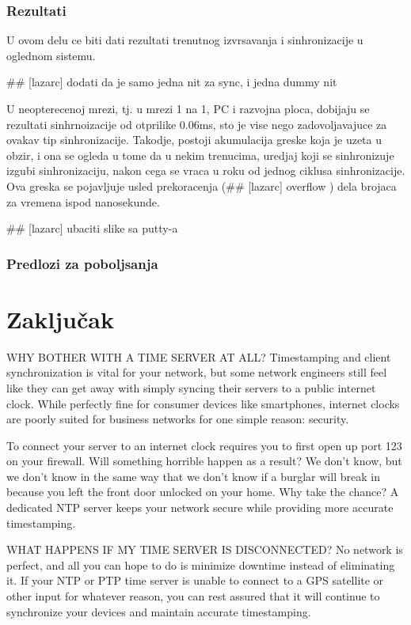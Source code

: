 \documentclass[a4paper,12pt, master]{etf}
\begin{document}
    \subsection{Rezultati}

    U ovom delu ce biti dati rezultati trenutnog izvrsavanja i sinhronizacije u oglednom sistemu.

    \#\# [lazarc] dodati da je samo jedna nit za sync, i jedna dummy nit

    U neopterecenoj mrezi, tj. u mrezi 1 na 1, PC i razvojna ploca, dobijaju se rezultati sinhrnoizacije od 
    otprilike 0.06ms, sto je vise nego zadovoljavajuce za ovakav tip sinhronizacije. Takodje, postoji 
    akumulacija greske koja je uzeta u obzir, i ona se ogleda u tome da u nekim trenucima, uredjaj koji se 
    sinhronizuje izgubi sinhronizaciju, nakon cega se vraca u roku od jednog ciklusa sinhronizacije. Ova 
    greska se pojavljuje usled prekoracenja (\#\# [lazarc] overflow ) dela brojaca za vremena ispod 
    nanosekunde. 

    \#\# [lazarc] ubaciti slike sa putty-a

    \subsection{Predlozi za poboljsanja}

	\newpage

	\chapter{Zaključak}

	WHY BOTHER WITH A TIME SERVER AT ALL?
	Timestamping and client synchronization is vital for your network, but some network 
	engineers still feel like they can get away with simply syncing their servers to a public 
	internet clock. While perfectly fine for consumer devices like smartphones, internet 
	clocks are poorly suited for business networks for one simple reason: security.

	To connect your server to an internet clock requires you to first open up port 123 on 
	your firewall. Will something horrible happen as a result? We don't know, but we don't 
	know in the same way that we don't know if a burglar will break in because you left the 
	front door unlocked on your home. Why take the chance? A dedicated NTP server keeps your 
	network secure while providing more accurate timestamping.

	WHAT HAPPENS IF MY TIME SERVER IS DISCONNECTED?
	No network is perfect, and all you can hope to do is minimize downtime instead of 
	eliminating it. If your NTP or PTP time server is unable to connect to a GPS satellite or 
	other input for whatever reason, you can rest assured that it will continue to 
	synchronize your devices and maintain accurate timestamping.
\end{document}
